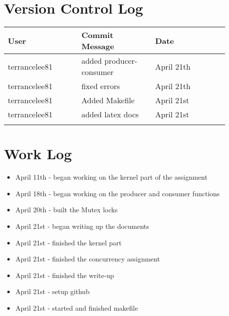 \documentclass[draftclsnofoot,onecolumn,10pt,compsoc]{IEEEtran}
\begin{document}
\section{Version Control Log}
\begin{center}
	\begin{tabular}{| p{0.3\linewidth} | p{0.3\linewidth} | p{0.3\linewidth} |}
		\hline User & Commit Message & Date\\
		\hline terrancelee81 & added producer-consumer& April 21th\\
		\hline terrancelee81 & fixed errors & April 21th\\
		\hline terrancelee81 & Added Makefile & April 21st\\
		\hline terrancelee81 & added latex docs& April 21st\\
		\hline &&\\		
	\end{tabular}
\end{center}
\section{Work Log}
\begin{itemize}
	\item April 11th - began working on the kernel part of the assignment
	\item April 18th - began working on the producer and consumer functions
	\item April 20th - built the Mutex locks
	\item April 21st - began writing up the documents
	\item April 21st - finished the kernel part
	\item April 21st - finished the concurrency assignment
	\item April 21st - finished the write-up
	\item April 21st - setup github
	\item April 21st - started and finished makefile
\end{itemize}
\end{document}
